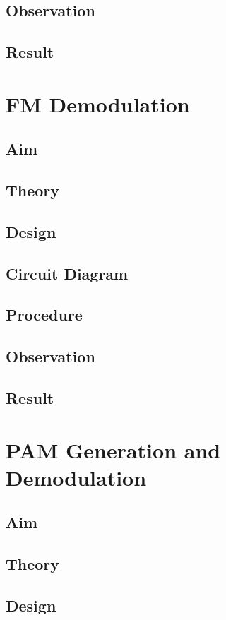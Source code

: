 \documentclass{book}
\begin{document}
\section*{Observation}
\section*{Result}
\chapter[FM Demodulation]{FM Demodulation}
\section*{Aim}
\section*{Theory}
\section*{Design}
\section*{Circuit Diagram}
\section*{Procedure}
\section*{Observation}
\section*{Result}

\chapter[PAM Generation and Demodulation]{PAM Generation and Demodulation}
\section*{Aim}
\section*{Theory}
\section*{Design}
\end{document}
